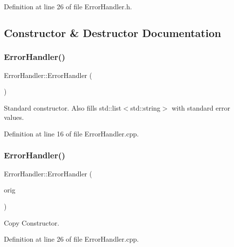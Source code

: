 Definition at line 26 of file Error\+Handler.\+h.



\subsection{Constructor \& Destructor Documentation}
\mbox{\label{classErrorHandler_a7e5f379bd231442b898cef94556b2107}} 
\subsubsection{\texorpdfstring{ErrorHandler()}{ErrorHandler()}\hspace{0.1cm}{\footnotesize\ttfamily [1/2]}}
{\footnotesize\ttfamily Error\+Handler\+::\+Error\+Handler (\begin{DoxyParamCaption}{ }\end{DoxyParamCaption})}



Standard constructor. Also fills std\+::list$<$std\+::string$>$ with standard error values. 



Definition at line 16 of file Error\+Handler.\+cpp.

\mbox{\label{classErrorHandler_add20b373ee276ee2ef040f6dd913a86b}} 
\subsubsection{\texorpdfstring{ErrorHandler()}{ErrorHandler()}\hspace{0.1cm}{\footnotesize\ttfamily [2/2]}}
{\footnotesize\ttfamily Error\+Handler\+::\+Error\+Handler (\begin{DoxyParamCaption}\item[{const \mbox{\hyperlink{classErrorHandler}{Error\+Handler}} \&}]{orig }\end{DoxyParamCaption})}



Copy Constructor. 



Definition at line 26 of file Error\+Handler.\+cpp.

